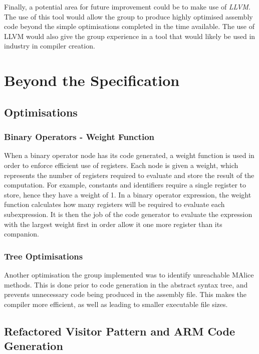 \documentclass[a4wide, 11pt]{article}
\begin{document}
Finally, a potential area for future improvement could be to make use of
\emph{LLVM}. The use of this tool would allow the group to produce highly
optimised assembly code beyond the simple optimisations completed in the time
available. The use of LLVM would also give the group experience in a tool that
would likely be used in industry in compiler creation.

\section{Beyond the Specification}

\subsection{Optimisations}

\subsubsection{Binary Operators - Weight Function}

When a binary operator node has its code generated, a weight function is used
in order to enforce efficient use of registers. Each node is given a weight,
which represents the number of registers required to evaluate and store the
result of the computation. For example, constants and identifiers require a 
single register to store, hence they have a weight of 1. In a binary operator
expression, the weight function calculates how many registers will be required 
to evaluate each subexpression. It is then the job of the code generator to 
evaluate the expression with the largest weight first in order allow it one more
register than its companion.

\subsubsection{Tree Optimisations}

Another optimisation the group implemented was to identify unreachable MAlice 
methods. This is done prior to code generation in the abstract syntax tree,
and prevents unnecessary code being produced in the assembly file. This makes
the compiler more efficient, as well as leading to smaller executable file
sizes.

\subsection{Refactored Visitor Pattern and ARM Code Generation}
\end{document}
